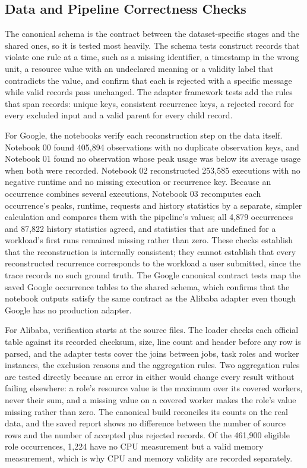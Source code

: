 \subsection{Data and Pipeline Correctness Checks}\label{sec:6.1}

The canonical schema is the contract between the dataset-specific stages and the shared ones, so it is tested most heavily. The schema tests construct records that violate one rule at a time, such as a missing identifier, a timestamp in the wrong unit, a resource value with an undeclared meaning or a validity label that contradicts the value, and confirm that each is rejected with a specific message while valid records pass unchanged. The adapter framework tests add the rules that span records: unique keys, consistent recurrence keys, a rejected record for every excluded input and a valid parent for every child record.

For Google, the notebooks verify each reconstruction step on the data itself. Notebook 00 found 405,894 observations with no duplicate observation keys, and Notebook 01 found no observation whose peak usage was below its average usage when both were recorded. Notebook 02 reconstructed 253,585 executions with no negative runtime and no missing execution or recurrence key. Because an occurrence combines several executions, Notebook 03 recomputes each occurrence's peaks, runtime, requests and history statistics by a separate, simpler calculation and compares them with the pipeline's values; all 4,879 occurrences and 87,822 history statistics agreed, and statistics that are undefined for a workload's first runs remained missing rather than zero. These checks establish that the reconstruction is internally consistent; they cannot establish that every reconstructed recurrence corresponds to the workload a user submitted, since the trace records no such ground truth. The Google canonical contract tests map the saved Google occurrence tables to the shared schema, which confirms that the notebook outputs satisfy the same contract as the Alibaba adapter even though Google has no production adapter.

For Alibaba, verification starts at the source files. The loader checks each official table against its recorded checksum, size, line count and header before any row is parsed, and the adapter tests cover the joins between jobs, task roles and worker instances, the exclusion reasons and the aggregation rules. Two aggregation rules are tested directly because an error in either would change every result without failing elsewhere: a role's resource value is the maximum over its covered workers, never their sum, and a missing value on a covered worker makes the role's value missing rather than zero. The canonical build reconciles its counts on the real data, and the saved report shows no difference between the number of source rows and the number of accepted plus rejected records. Of the 461,900 eligible role occurrences, 1,224 have no CPU measurement but a valid memory measurement, which is why CPU and memory validity are recorded separately.

